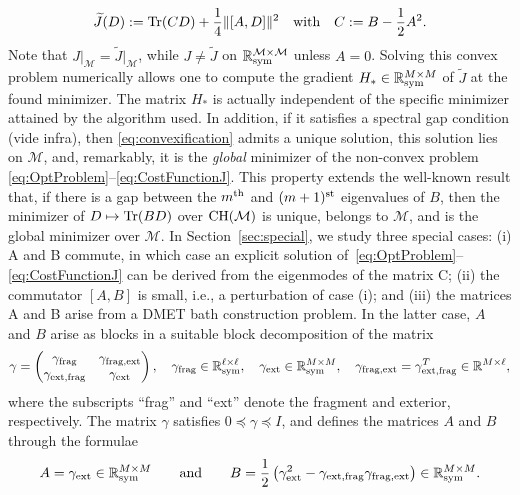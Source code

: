 \documentclass{article}
\def\R{\mathbb R}
\newcommand{\tr}{{\rm Tr}}
\newcommand{\1}{{\mathds 1}}
\begin{document}
\begin{equation}
\widetilde J(D):=  \tr(CD)+ \frac 14 \| [A,D] \|^2  \quad \mbox{with} \quad C := B- \frac 12A^2.
\end{equation}
Note that $J\big|_\mathcal{M} = \widetilde J\big|_\mathcal{M}$, while $J\neq \widetilde J$ on $\mathcal{\R^{M \times M}_{\rm sym}}$ unless $A=0$. Solving this convex problem numerically allows one to compute the gradient $H_* \in \R^{M \times M}_{\rm sym}$ of $\widetilde J$ at the found minimizer. The matrix $H_*$ is actually independent of the specific minimizer attained by the algorithm used. In addition, if it satisfies a spectral gap condition (vide infra), then \eqref{eq:convexification} admits a unique solution, this solution lies on $\mathcal M$, and, remarkably, it is the {\em global} minimizer of the non-convex problem \eqref{eq:OptProblem}--\eqref{eq:CostFunctionJ}.
This property extends the well-known result that, if there is a gap between the $m^{\rm th}$ and $(m+1)^{\rm st}$ eigenvalues of $B$, then the minimizer of $D \mapsto \tr(BD)$ over ${\rm CH}(\mathcal M)$ is unique, belongs to $\mathcal M$, and is the global minimizer over $\mathcal M$. In Section~\ref{sec:special}, we study three special cases: (i) A and B commute, in which case an explicit solution of~\eqref{eq:OptProblem}--\eqref{eq:CostFunctionJ} can be derived from the eigenmodes of the matrix C; (ii) the commutator $[A,B]$ is small, i.e., a perturbation of case (i); and (iii) the matrices A and B arise from a DMET bath construction problem. In the latter case, $A$ and $B$ arise as blocks in a suitable block decomposition of the matrix
\begin{align*}
     \gamma = \begin{pmatrix}
        \gamma_{\rm frag } & \gamma_{{\rm frag}, \rm ext}\\
        \gamma_{{\rm ext}, \rm frag} & \gamma_{\rm ext} \end{pmatrix}, \quad \gamma_{\rm frag } \in \R^{\ell \times \ell}_{\rm sym}, \quad   \gamma_{\rm ext} \in \R^{M \times M}_{\rm sym}, \quad \gamma_{{\rm frag}, \rm ext} = \gamma_{{\rm ext}, \rm frag}^T \in \mathbb{R}^{M \times \ell},
\end{align*}
where the subscripts ``frag'' and  ``ext'' denote the fragment and exterior, respectively. The matrix $\gamma$ satisfies $0 \preceq \gamma  \preceq I$, and defines the matrices $A$ and $B$ through the formulae
\begin{align}
\label{rdm1_AB}
A=\gamma_{\rm ext} \in \R^{M \times M}_{\rm sym}
\qquad {\rm and} \qquad 
B=\frac 12 \left(\gamma_{\rm ext}^2-\gamma_{\rm ext,frag} \gamma_{\rm frag,ext}\right)\in \R^{M \times M}_{\rm sym}.
\end{align}
\end{document}
